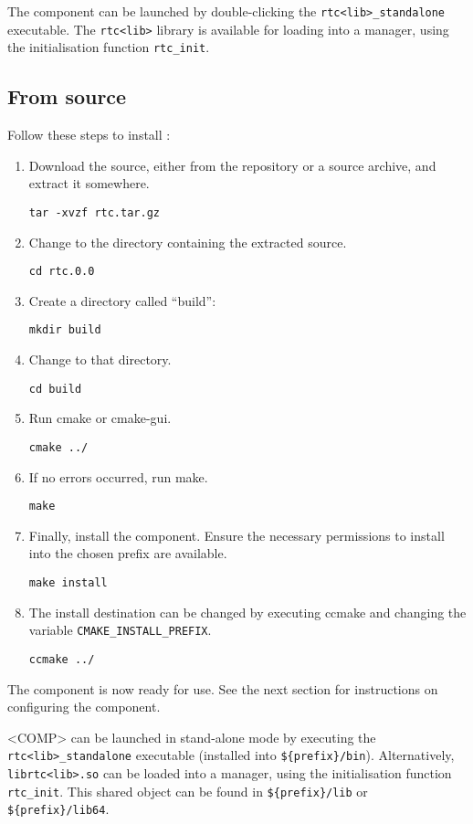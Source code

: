 \documentclass[a4paper,10pt]{article}
\begin{document}
The component can be launched by double-clicking the
\verb|rtc<lib>_standalone| executable. The \verb|rtc<lib>| library
is available for loading into a manager, using the initialisation function
\verb|rtc_init|.

\subsection{From source}

Follow these steps to install :

\begin{enumerate}
  \item Download the source, either from the repository or a source archive,
  and extract it somewhere.

  \verb|tar -xvzf rtc.tar.gz|
  \item Change to the directory containing the extracted source.

  \verb|cd rtc.0.0|
  \item Create a directory called ``build'':

  \verb|mkdir build|
  \item Change to that directory.

  \verb|cd build|
  \item Run cmake or cmake-gui.

  \verb|cmake ../|
  \item If no errors occurred, run make.

  \verb|make|
  \item Finally, install the component. Ensure the necessary permissions to
  install into the chosen prefix are available.

  \verb|make install|
  \item The install destination can be changed by executing ccmake and changing
  the variable \verb|CMAKE_INSTALL_PREFIX|.

  \verb|ccmake ../|
\end{enumerate}

The component is now ready for use. See the next section for instructions on
configuring the component.

<COMP> can be launched in stand-alone mode by executing the
\verb|rtc<lib>_standalone| executable (installed into \verb|${prefix}/bin|).
Alternatively, \verb|librtc<lib>.so| can be loaded into a manager, using the
initialisation function \verb|rtc_init|. This shared object can be found in
\verb|${prefix}/lib| or \verb|${prefix}/lib64|.
\end{document}

